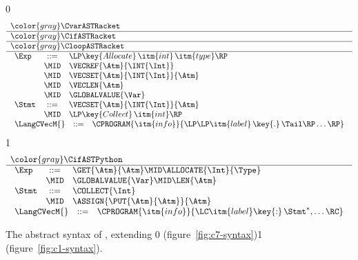 \documentclass[7x10]{TimesAPriori_MIT}%
\newcommand{\gray}[1]{{\color{gray} #1}}
\def\racketEd{0}
\def\pythonEd{1}
\def\edition{0}
\newcommand{\racket}[1]{{\if\edition\racketEd{#1}\fi}}
\newcommand{\python}[1]{{\if\edition\pythonEd #1\fi}}
\numberwithin{theorem}{chapter}
\numberwithin{definition}{chapter}
\numberwithin{equation}{chapter}
\begin{document}
\newcommand{\CtupASTRacket}{
\begin{array}{lcl}
\Exp &::= & \LP\key{Allocate} \,\itm{int}\,\itm{type}\RP \\
   &\MID& \VECREF{\Atm}{\INT{\Int}}  \\
   &\MID& \VECSET{\Atm}{\INT{\Int}}{\Atm} \\
   &\MID& \VECLEN{\Atm} \\
   &\MID& \GLOBALVALUE{\Var} \\
\Stmt &::=& \VECSET{\Atm}{\INT{\Int}}{\Atm} \\
    &\MID& \LP\key{Collect} \,\itm{int}\RP 
\end{array}
}
  
\newcommand{\CtupASTPython}{
\begin{array}{lcl}
\Exp &::= & \GET{\Atm}{\Atm} \MID \ALLOCATE{\Int}{\Type} \\
      &\MID& \GLOBALVALUE{\Var} \MID \LEN{\Atm} \\
\Stmt &::=& \COLLECT{\Int} \\
     &\MID& \ASSIGN{\PUT{\Atm}{\Atm}}{\Atm} 
\end{array}
}

\begin{figure}[tp]
  \begin{tcolorbox}[colback=white]
    \small
{\if\edition\racketEd    
\[
\begin{array}{l}
  \gray{\CvarASTRacket} \\ \hline
  \gray{\CifASTRacket} \\ \hline
  \gray{\CloopASTRacket} \\ \hline
  \CtupASTRacket \\
  \begin{array}{lcl}
    \LangCVecM{} & ::= & \CPROGRAM{\itm{info}}{\LP\LP\itm{label}\,\key{.}\,\Tail\RP\ldots\RP}
  \end{array}
\end{array}
\]
\fi}
{\if\edition\pythonEd
\[
\begin{array}{l}
  \gray{\CifASTPython} \\ \hline
  \CtupASTPython \\
\begin{array}{lcl}
\LangCVecM{} & ::= & \CPROGRAM{\itm{info}}{\LC\itm{label}\key{:}\,\Stmt^{*}, \ldots \RC}
\end{array}
\end{array}
\]
\fi}
  \end{tcolorbox}

\caption{The abstract syntax of \LangCVec{}, extending
  \racket{\LangCLoop{} (figure~\ref{fig:c7-syntax})}\python{\LangCIf{}
  (figure~\ref{fig:c1-syntax})}.}
\label{fig:c2-syntax}
\end{figure}
\end{document}
